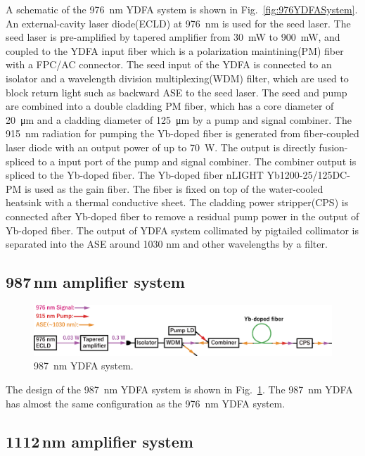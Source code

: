 \documentclass{osa-article}
\begin{document}
A schematic of the \SI{976}{nm} YDFA system is shown in Fig.~\ref{fig:976YDFASystem}.
An external-cavity laser diode(ECLD) at \SI{976}{nm} is used for the seed laser.
The seed laser is pre-amplified by tapered amplifier from \SI{30}{mW} to \SI{900}{mW}, and coupled to the YDFA input fiber which is a polarization maintining(PM) fiber with a FPC/AC connector.
The seed input of the YDFA is connected to an isolator and a wavelength division multiplexing(WDM) filter, which are used to block return light such as backward ASE to the seed laser.
The seed and pump are combined into a double cladding PM fiber, which has a core diameter of \SI{20}{\micro m} and a cladding diameter of \SI{125}{\micro m} by a pump and signal combiner.
The \SI{915}{nm} radiation for pumping the Yb-doped fiber is generated from fiber-coupled laser diode with an output power of up to \SI{70}{W}.
The output is directly fusion-spliced to a input port of the pump and signal combiner.
The combiner output is spliced to the Yb-doped fiber.
The Yb-doped fiber nLIGHT Yb1200-25/125DC-PM is used as the gain fiber.
The fiber is fixed on top of the water-cooled heatsink with a thermal conductive sheet.
The cladding power stripper(CPS) is connected after Yb-doped fiber to remove a residual pump power in the output of Yb-doped fiber.
The output of YDFA system collimated by pigtailed collimator is separated into the ASE around 1030 nm and other wavelengths by a filter.


\subsection{987\,nm amplifier system}

\begin{figure}[h!]
  \centering\includegraphics[width=\linewidth]{./Figure/976nmYDFASystem.eps}
  \caption{\SI{987}{nm} YDFA system.}
  \label{fig:987YDFASystem}
\end{figure}

The design of the \SI{987}{nm} YDFA system is shown in Fig.~\ref{fig:987YDFASystem}.
The \SI{987}{nm} YDFA has almost the same configuration as the \SI{976}{nm} YDFA system.


\subsection{1112\,nm amplifier system}
\end{document}
